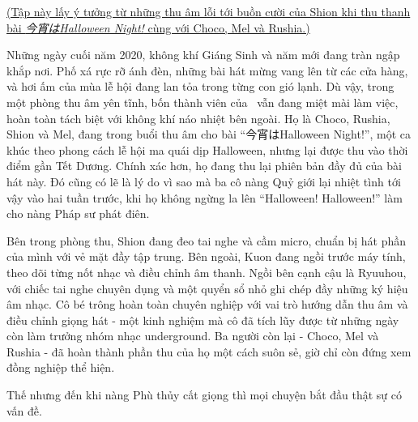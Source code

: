\documentclass[../main.tex]{subfiles}
\begin{document}

\begin{center}
  \uline{(Tập này lấy ý tưởng từ những thu âm lỗi tới buồn cười của Shion khi thu thanh bài \textit{今宵はHalloween Night!} cùng với Choco, Mel và Rushia.)}
\end{center}

Những ngày cuối năm 2020, không khí Giáng Sinh và năm mới đang tràn ngập khắp nơi. Phố xá rực rỡ ánh đèn, những bài hát mừng vang lên từ các cửa hàng, và hơi ấm của mùa lễ hội đang lan tỏa trong từng con gió lạnh. Dù vậy, trong một phòng thu âm yên tĩnh, bốn thành viên của \hll\ vẫn đang miệt mài làm việc, hoàn toàn tách biệt với không khí náo nhiệt bên ngoài. Họ là Choco, Rushia, Shion và Mel, đang trong buổi thu âm cho bài ``今宵はHalloween Night!'', một ca khúc theo phong cách lễ hội ma quái dịp Halloween, nhưng lại được thu vào thời điểm gần Tết Dương. Chính xác hơn, họ đang thu lại phiên bản đầy đủ của bài hát này. Đó cũng có lẽ là lý do vì sao mà ba cô nàng Quỷ giới lại nhiệt tình tới vậy vào hai tuần trước, khi họ không ngừng la lên ``Halloween! Halloween!'' làm cho nàng Pháp sư phát điên.

Bên trong phòng thu, Shion đang đeo tai nghe và cầm micro, chuẩn bị hát phần của mình với vẻ mặt đầy tập trung. Bên ngoài, Kuon đang ngồi trước máy tính, theo dõi từng nốt nhạc và điều chỉnh âm thanh. Ngồi bên cạnh cậu là Ryuuhou, với chiếc tai nghe chuyên dụng và một quyển sổ nhỏ ghi chép đầy những ký hiệu âm nhạc. Cô bé trông hoàn toàn chuyên nghiệp với vai trò hướng dẫn thu âm và điều chỉnh giọng hát - một kinh nghiệm mà cô đã tích lũy được từ những ngày còn làm trưởng nhóm nhạc underground. Ba người còn lại - Choco, Mel và Rushia - đã hoàn thành phần thu của họ một cách suôn sẻ, giờ chỉ còn đứng xem đồng nghiệp thể hiện.

Thế nhưng đến khi nàng Phù thủy cất giọng thì mọi chuyện bắt đầu thật sự có vấn đề.
\end{document}
